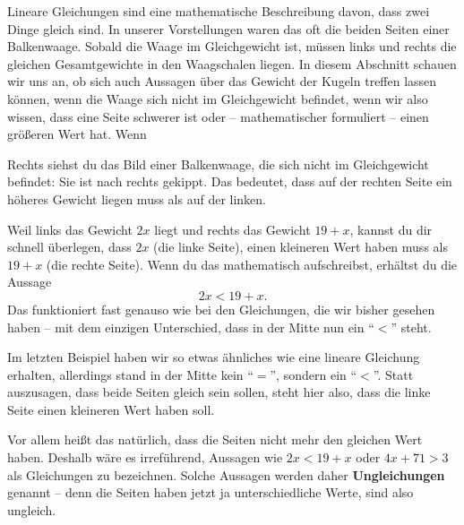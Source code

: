 \documentclass[../../main.tex]{subfiles}
\begin{document}
Lineare Gleichungen sind eine mathematische Beschreibung davon, dass zwei Dinge gleich sind. In unserer Vorstellungen waren das oft die beiden Seiten einer Balkenwaage. Sobald die Waage im Gleichgewicht ist, müssen links und rechts die gleichen Gesamtgewichte in den Waagschalen liegen. In diesem Abschnitt schauen wir uns an, ob sich auch Aussagen über das Gewicht der Kugeln treffen lassen können, wenn die Waage sich nicht im Gleichgewicht befindet, wenn wir also wissen, dass eine Seite schwerer ist oder -- mathematischer formuliert -- einen größeren Wert hat.
Wenn 
\begin{example}{}
    
    Rechts siehst du das Bild einer Balkenwaage, die sich nicht im Gleichgewicht befindet: Sie ist nach rechts gekippt. Das bedeutet, dass auf der rechten Seite ein höheres Gewicht liegen muss als auf der linken.
    
    Weil links das Gewicht $2x$ liegt und rechts das Gewicht $19+x$, kannst du dir schnell überlegen, dass $2x$ (die linke Seite), einen kleineren Wert haben muss als $19+x$ (die rechte Seite). Wenn du das mathematisch aufschreibst, erhältst du die Aussage
    \[2x<19+x.\]
    Das funktioniert fast genauso wie bei den Gleichungen, die wir bisher gesehen haben -- mit dem einzigen Unterschied, dass in der Mitte nun ein \enquote{$<$} steht.
\end{example}

Im letzten Beispiel haben wir so etwas ähnliches wie eine lineare Gleichung erhalten, allerdings stand in der Mitte kein \enquote{$=$}, sondern ein \enquote{$<$}. Statt auszusagen, dass beide Seiten gleich sein sollen, steht hier also, dass die linke Seite einen kleineren Wert haben soll. 

Vor allem heißt das natürlich, dass die Seiten nicht mehr den gleichen Wert haben. Deshalb wäre es irreführend, Aussagen wie $2x<19+x$ oder $4x+71>3$ als Gleichungen zu bezeichnen. Solche Aussagen werden daher \textbf{Ungleichungen} genannt -- denn die Seiten haben jetzt ja unterschiedliche Werte, sind also ungleich.
\end{document}
